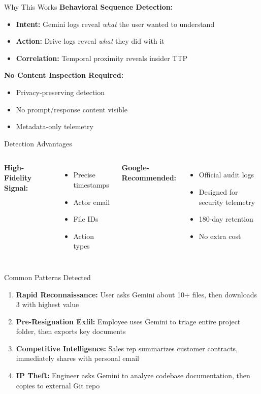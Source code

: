 \documentclass[aspectratio=169]{beamer}
\begin{document}
\begin{frame}{Why This Works}
\textbf{Behavioral Sequence Detection:}
\begin{itemize}
    \item \textbf{Intent:} Gemini logs reveal \textit{what} the user wanted to understand
    \item \textbf{Action:} Drive logs reveal \textit{what} they did with it
    \item \textbf{Correlation:} Temporal proximity reveals insider TTP
\end{itemize}

\vspace{1em}

\textbf{No Content Inspection Required:}
\begin{itemize}
    \item Privacy-preserving detection
    \item No prompt/response content visible
    \item Metadata-only telemetry
\end{itemize}
\end{frame}

\begin{frame}{Detection Advantages}
\begin{columns}[T]
\textbf{High-Fidelity Signal:}
\begin{itemize}
    \item Precise timestamps
    \item Actor email
    \item File IDs
    \item Action types
\end{itemize}

\textbf{Google-Recommended:}
\begin{itemize}
    \item Official audit logs
    \item Designed for security telemetry
    \item 180-day retention
    \item No extra cost
\end{itemize}
\end{columns}
\end{frame}

\begin{frame}{Common Patterns Detected}
\begin{enumerate}
    \item \textbf{Rapid Reconnaissance:} User asks Gemini about 10+ files, then downloads 3 with highest value
    \item \textbf{Pre-Resignation Exfil:} Employee uses Gemini to triage entire project folder, then exports key documents
    \item \textbf{Competitive Intelligence:} Sales rep summarizes customer contracts, immediately shares with personal email
    \item \textbf{IP Theft:} Engineer asks Gemini to analyze codebase documentation, then copies to external Git repo
\end{enumerate}
\end{frame}
\end{document}
